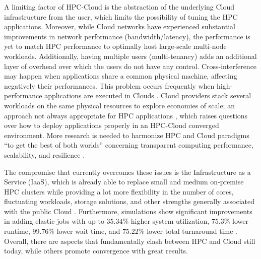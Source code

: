 
        A limiting factor of HPC-Cloud is the abstraction of the underlying Cloud infrastructure from the user, which limits the possibility of tuning the HPC applications. Moreover, while Cloud networks have experienced substantial improvements in network performance (bandwidth/latency), the performance is yet to match HPC performance to optimally host large-scale multi-node workloads. Additionally, having multiple users (multi-tenancy) adds an additional layer of overhead over which the users do not have any control. Cross-interference may happen when applications share a common physical machine, affecting negatively their performances. This problem occurs frequently when high-performance applications are executed in Clouds \cite{alves_interference-aware_2020}. Cloud providers stack several workloads on the same physical resources to explore economies of scale; an approach not always appropriate for HPC applications \cite{netto_hpc_2019}, which raises questions over how to deploy applications properly in an HPC-Cloud converged environment. More research is needed to harmonize HPC and Cloud paradigms “to get the best of both worlds” concerning transparent computing performance, scalability, and resilience \cite{marques_harnessing_2021}.

        The compromise that currently overcomes these issues is the Infrastructure as a Service (IaaS), which is already able to replace small and medium on-premise HPC clusters while providing a lot more flexibility in the number of cores, fluctuating workloads, storage solutions, and other strengths generally associated with the public Cloud \cite{fernandez_evaluation_2022}. Furthermore, simulations show significant improvements in adding elastic jobs with up to 35.34\% higher system utilization, 75.3\% lower runtime, 99.76\% lower wait time, and 75.22\% lower total turnaround time \cite{eberius_evaluating_2023}. Overall, there are aspects that fundamentally clash between HPC and Cloud still today, while others promote convergence with great results.

